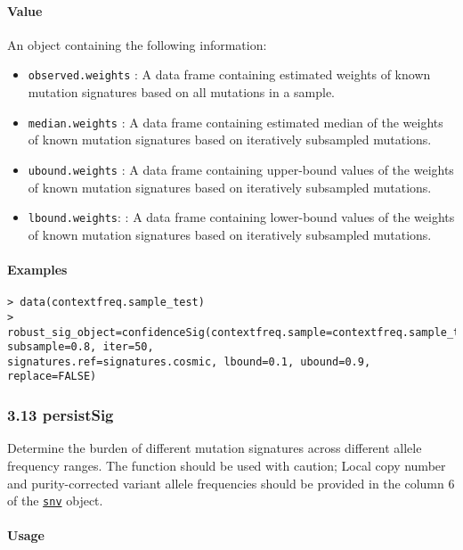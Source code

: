 \documentclass[]{article}
\providecommand{\tightlist}{%
  \setlength{\itemsep}{0pt}\setlength{\parskip}{0pt}}
\let\oldparagraph\paragraph
\renewcommand{\paragraph}[1]{\oldparagraph{#1}\mbox{}}
\begin{document}
\paragraph{\texorpdfstring{\textbf{Value}}{Value}}\label{value-8}

An object containing the following information:

\begin{itemize}
\tightlist
\item
  \texttt{observed.weights} : A data frame containing estimated weights
  of known mutation signatures based on all mutations in a sample.
\item
  \texttt{median.weights} : A data frame containing estimated median of
  the weights of known mutation signatures based on iteratively
  subsampled mutations.
\item
  \texttt{ubound.weights} : A data frame containing upper-bound values
  of the weights of known mutation signatures based on iteratively
  subsampled mutations.
\item
  \texttt{lbound.weights}: : A data frame containing lower-bound values
  of the weights of known mutation signatures based on iteratively
  subsampled mutations.
\end{itemize}

\paragraph{\texorpdfstring{\textbf{Examples}}{Examples}}\label{examples-10}

\begin{verbatim}
> data(contextfreq.sample_test)
> robust_sig_object=confidenceSig(contextfreq.sample=contextfreq.sample_test, subsample=0.8, iter=50, 
signatures.ref=signatures.cosmic, lbound=0.1, ubound=0.9, replace=FALSE)
\end{verbatim}

\subsubsection{3.13 persistSig}\label{persistsig}

Determine the burden of different mutation signatures across different allele frequency ranges. The function should be used with caution; Local copy number and purity-corrected variant allele frequencies should be provided in the column 6 of the \protect\hyperlink{snv}{\texttt{snv}} object.

\paragraph{\texorpdfstring{\textbf{Usage}}{Usage}}\label{usage-11}
\end{document}
